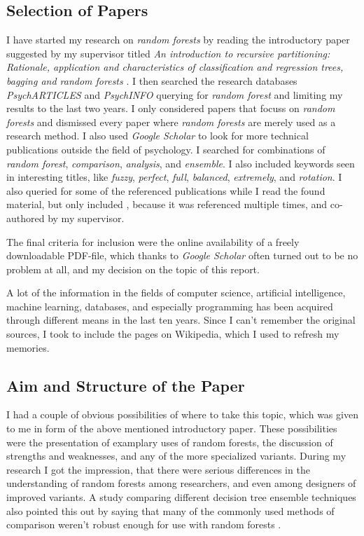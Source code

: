 \documentclass[a4paper,man,12pt,apacite]{apa6} %
\begin{document}
\subsection{Selection of Papers}
I have started my research on \emph{random forests} by reading the
introductory paper suggested by my supervisor titled
\emph{An introduction to recursive partitioning: Rationale, application
and characteristics of classification and regression trees, bagging and
random forests} \cite{strobl2009introduction}.
I then searched the research databases \emph{PsychARTICLES} and
\emph{PsychINFO} querying for \emph{random forest} and limiting my results
to the last two years.
I only considered papers that focuss on \emph{random forests} and
dismissed every paper where \emph{random forests} are merely used as a
research method.
I also used \emph{Google Scholar} to look for more technical
publications outside the field of psychology.
I searched for combinations of \emph{random forest}, \emph{comparison},
\emph{analysis}, and \emph{ensemble}.
I also included keywords seen in interesting titles, like \emph{fuzzy},
\emph{perfect}, \emph{full}, \emph{balanced}, \emph{extremely}, and
\emph{rotation}.
I also queried for some of the referenced publications while I read the
found material, but only included \cite{strobl2008conditional}, because
it was referenced multiple times, and co-authored by my supervisor.

The final criteria for inclusion were the online availability of a freely
downloadable PDF-file, which thanks to \emph{Google Scholar} often turned
out to be no problem at all, and my decision on the topic of
this report.

A lot of the information in the fields of computer science, artificial
intelligence, machine learning, databases, and especially programming
has been acquired through different means in the last ten years.
Since I can't remember the original sources, I took to include the pages
on Wikipedia, which I used to refresh my memories.

\subsection{Aim and Structure of the Paper}
I had a couple of obvious possibilities of where to take this topic, which
was given to me in form of the above mentioned introductory paper.
These possibilities were the presentation of examplary uses of random
forests, the discussion of strengths and weaknesses, and any of the more
specialized variants.
During my research I got the impression, that there were serious
differences in the understanding of random forests among researchers,
and even among designers of improved variants.
A study comparing different decision tree ensemble techniques also pointed
this out by saying that many of the commonly used methods of comparison
weren't robust enough for use with random forests \cite{banfield2007comparison}.
\end{document}
